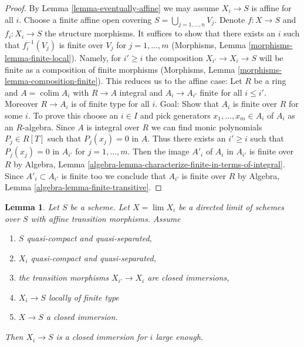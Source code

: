 \documentclass{stacks-project}
\theoremstyle{plain}
\newtheorem{lemma}[subsection]{Lemma}
\theoremstyle{definition}
\theoremstyle{remark}
\numberwithin{equation}{subsection}
\def\lim{\mathop{\mathrm{lim}}\nolimits}
\def\colim{\mathop{\mathrm{colim}}\nolimits}
\begin{document}
\begin{proof}
By Lemma \ref{lemma-eventually-affine}
we may assume $X_i \to S$ is affine for all $i$.
Choose a finite affine open covering $S = \bigcup_{j = 1, \ldots, n} V_j$.
Denote $f : X \to S$ and $f_i : X_i \to S$ the structure morphisms.
It suffices to show that there exists an $i$ such that
$f_i^{-1}(V_j)$ is finite over $V_j$ for $j = 1, \ldots, m$
(Morphisms, Lemma \ref{morphisms-lemma-finite-local}).
Namely, for $i' \geq i$ the composition $X_{i'} \to X_i \to S$
will be finite as a composition of finite morphisms
(Morphisms, Lemma \ref{morphisms-lemma-composition-finite}).
This reduces us to the affine case: Let $R$ be a ring and
$A = \colim A_i$ with $R \to A$ integral and $A_i \to A_{i'}$
finite for all $i \leq i'$. Moreover $R \to A_i$ is of finite type
for all $i$. Goal: Show that $A_i$ is finite over $R$ for some $i$.
To prove this choose an $i \in I$ and pick generators
$x_1, \ldots, x_m \in A_i$ of $A_i$ as an $R$-algebra.
Since $A$ is integral over $R$ we can find monic polynomials
$P_j \in R[T]$ such that $P_j(x_j) = 0$ in $A$.
Thus there exists an $i' \geq i$ such that $P_j(x_j) = 0$ in $A_{i'}$
for $j = 1, \ldots, m$. Then the image $A'_i$ of $A_i$ in $A_{i'}$
is finite over $R$ by
Algebra, Lemma \ref{algebra-lemma-characterize-finite-in-terms-of-integral}.
Since $A'_i \subset A_{i'}$ is finite too we conclude
that $A_{i'}$ is finite over $R$ by
Algebra, Lemma \ref{algebra-lemma-finite-transitive}.
\end{proof}

\begin{lemma}
\label{lemma-eventually-closed-immersion}
Let $S$ be a scheme. Let $X = \lim X_i$ be a directed limit of schemes
over $S$ with affine transition morphisms. Assume
\begin{enumerate}
\item $S$ quasi-compact and quasi-separated,
\item $X_i$ quasi-compact and quasi-separated,
\item the transition morphisms $X_{i'} \to X_i$ are closed immersions,
\item $X_i \to S$ locally of finite type
\item $X \to S$ a closed immersion.
\end{enumerate}
Then $X_i \to S$ is a closed immersion for $i$ large enough.
\end{lemma}
\end{document}
